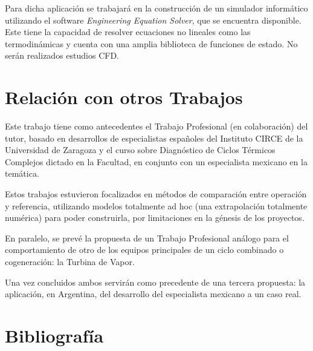 \documentclass[a4paper]{article}
\begin{document}
Para dicha aplicación se trabajará en la construcción de un simulador informático utilizando el software \textit{Engineering Equation Solver}, que se encuentra disponible. Este tiene la capacidad de resolver ecuaciones no lineales como las termodinámicas y cuenta con una amplia biblioteca de funciones de estado. No serán realizados estudios CFD.

\section*{Relación con otros Trabajos}

Este trabajo tiene como antecedentes el Trabajo Profesional (en colaboración) del tutor, basado en desarrollos de especialistas españoles del Instituto CIRCE de la Universidad de Zaragoza y el curso sobre Diagnóstico de Ciclos Térmicos Complejos dictado en la Facultad, en conjunto con un especialista mexicano en la temática.

Estos trabajos estuvieron focalizados en métodos de comparación entre operación y referencia, utilizando modelos totalmente ad hoc (una extrapolación totalmente numérica) para poder construirla, por limitaciones en la génesis de los proyectos.

En paralelo, se prevé la propuesta de un Trabajo Profesional análogo para el comportamiento de otro de los equipos principales de un ciclo combinado o cogeneración: la Turbina de Vapor. 

Una vez concluidos ambos servirán como precedente de una tercera propuesta: la aplicación, en Argentina, del desarrollo del especialista mexicano a un caso real.

\newpage
\section*{Bibliografía}
\end{document}
